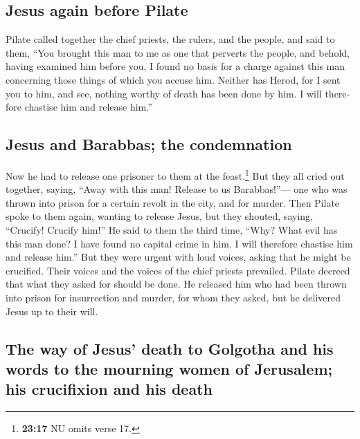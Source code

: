 \begin{paracol}{2}
\begin{otherlanguage}{english}
\begin{otherlanguage}{english}
\hypertarget{jesus-again-before-pilate}{%
\subsection{Jesus again before Pilate}\label{jesus-again-before-pilate}}

 Pilate called together the chief priests, the rulers,
and the people,  and said to them, ``You brought this man
to me as one that perverts the people, and behold, having examined him
before you, I found no basis for a charge against this man concerning
those things of which you accuse him.  Neither has Herod,
for I sent you to him, and see, nothing worthy of death has been done by
him.  I will therefore chastise him and release him.''

\hypertarget{jesus-and-barabbas-the-condemnation}{%
\subsection{Jesus and Barabbas; the
condemnation}\label{jesus-and-barabbas-the-condemnation}}

 Now he had to release one prisoner to them at the
feast.\footnote{\textbf{23:17} NU omits verse 17.}  But
they all cried out together, saying, ``Away with this man! Release to us
Barabbas!''---  one who was thrown into prison for a
certain revolt in the city, and for murder.  Then Pilate
spoke to them again, wanting to release Jesus,  but they
shouted, saying, ``Crucify! Crucify him!''  He said to
them the third time, ``Why? What evil has this man done? I have found no
capital crime in him. I will therefore chastise him and release him.''
 But they were urgent with loud voices, asking that he
might be crucified. Their voices and the voices of the chief priests
prevailed.  Pilate decreed that what they asked for
should be done.  He released him who had been thrown into
prison for insurrection and murder, for whom they asked, but he
delivered Jesus up to their will.

\hypertarget{the-way-of-jesus-death-to-golgotha-and-his-words-to-the-mourning-women-of-jerusalem-his-crucifixion-and-his-death}{%
\subsection{The way of Jesus' death to Golgotha and his words to the
mourning women of Jerusalem; his crucifixion and his
death}\label{the-way-of-jesus-death-to-golgotha-and-his-words-to-the-mourning-women-of-jerusalem-his-crucifixion-and-his-death}}


\end{otherlanguage}
\end{otherlanguage}
\end{paracol}
